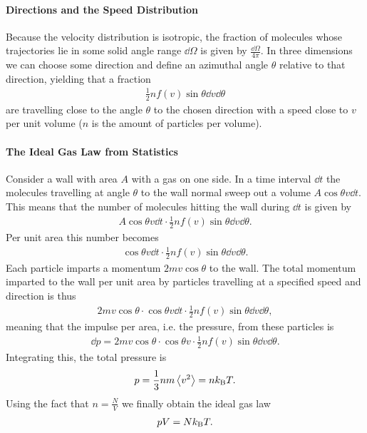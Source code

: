 \paragraph{Directions and the Speed Distribution}
Because the velocity distribution is isotropic, the fraction of molecules whose trajectories lie in some solid angle range $\dd{\Omega}$ is given by $\frac{\dd{\Omega}}{4\pi}$. In three dimensions we can choose some direction and define an azimuthal angle $\theta$ relative to that direction, yielding that a fraction
\begin{align*}
	\frac{1}{2}nf(v)\sin{\theta}\dd{v}\dd{\theta}
\end{align*}
are travelling close to the angle $\theta$ to the chosen direction with a speed close to $v$ per unit volume ($n$ is the amount of particles per volume).

\paragraph{The Ideal Gas Law from Statistics}
Consider a wall with area $A$ with a gas on one side. In a time interval $\dd{t}$ the molecules travelling at angle $\theta$ to the wall normal sweep out a volume $A\cos{\theta}v\dd{t}$. This means that the number of molecules hitting the wall during $\dd{t}$ is given by
\begin{align*}
	A\cos{\theta}v\dd{t}\cdot\frac{1}{2}nf(v)\sin{\theta}\dd{v}\dd{\theta}.
\end{align*}
Per unit area this number becomes
\begin{align*}
	\cos{\theta}v\dd{t}\cdot\frac{1}{2}nf(v)\sin{\theta}\dd{v}\dd{\theta}.
\end{align*}
Each particle imparts a momentum $2mv\cos{\theta}$ to the wall. The total momentum imparted to the wall per unit area by particles travelling at a specified speed and direction is thus
\begin{align*}
	2mv\cos{\theta}\cdot\cos{\theta}v\dd{t}\cdot\frac{1}{2}nf(v)\sin{\theta}\dd{v}\dd{\theta},
\end{align*}
meaning that the impulse per area, i.e. the pressure, from these particles is
\begin{align*}
	\dd{p} = 2mv\cos{\theta}\cdot\cos{\theta}v\cdot\frac{1}{2}nf(v)\sin{\theta}\dd{v}\dd{\theta}.
\end{align*}
Integrating this, the total pressure is
\begin{align*}
	p = \frac{1}{3}nm\expval{v^{2}} = nk_{\text{B}} T.
\end{align*}
Using the fact that $n = \frac{N}{V}$ we finally obtain the ideal gas law
\begin{align*}
	pV = Nk_{\text{B}} T.
\end{align*}

